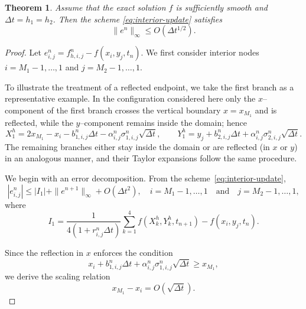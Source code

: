 \documentclass[11pt]{article}
\theoremstyle{mythm}
\newtheorem{theorem}{Theorem}
\theoremstyle{definition}
\begin{document}
	\begin{theorem}
		\label{pw2}
		Assume that the exact solution $f$ is sufficiently smooth and $\Delta t = h_1 = h_2$. Then the scheme \eqref{eq:interior-update} satisfies
		\[
		\|e^n\|_\infty \le O( \Delta t^{1/2}).
		\]
	\end{theorem}
	\begin{proof}
		Let $e_{i,j}^n = f_{h,i,j}^n - f(x_i,y_j,t_n)$. We first consider interior nodes $i = M_1 - 1, \ldots, 1$ and $j = M_2 - 1, \ldots, 1$. 
		
		To illustrate the treatment of a reflected endpoint, we take the first branch as a representative example. In the configuration considered here only the $x$–component of the first branch crosses the vertical boundary $x=x_{M_1}$ and is reflected, while the $y$–component remains inside the domain; hence
		\[
		X_1^h = 2x_{M_1}-x_i - b_{1,i,j}^n\Delta t - \alpha_{i,j}^n\sigma_{1,i,j}^n\sqrt{\Delta t},\qquad
		Y_1^h = y_j + b_{2,i,j}^n\Delta t + \alpha_{i,j}^n\sigma_{2,i,j}^n\sqrt{\Delta t}.
		\]
		The remaining branches either stay inside the domain or are reflected (in $x$ or $y$) in an analogous manner, and their Taylor expansions follow the same procedure.
		
		We begin with an error decomposition. From the scheme~\eqref{eq:interior-update},
		\[
		|e_{i,j}^n|
		\le |I_1| + \|e^{n+1}\|_\infty + O(\Delta t^2),\quad i = M_1 - 1, \ldots, 1\quad \text{and}\quad j = M_2 - 1, \ldots, 1,
		\]
		where
		\[
		I_1=\frac{1}{4(1+r_{i,j}^n\Delta t)}
		\sum_{k=1}^4 f(X_k^h,Y_k^h,t_{n+1}) - f(x_i,y_j,t_n).
		\]
		
		
		Since the reflection in $x$ enforces the condition
		\[
		x_i + b_{1,i,j}^n\Delta t + \alpha_{i,j}^n\sigma_{1,i,j}^n\sqrt{\Delta t} \ge x_{M_1},
		\]
		we derive the scaling relation
		\begin{equation}
			\label{eq:x-scaling-clean}
			x_{M_1}-x_i = O(\sqrt{\Delta t}).
		\end{equation}
		

\end{proof}
\end{document}
